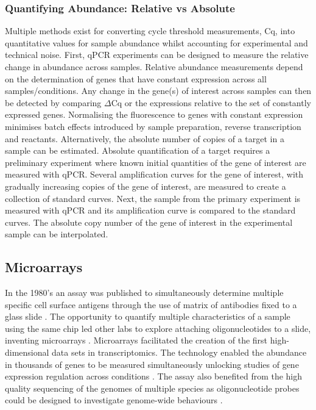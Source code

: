 \documentclass[../main.tex]{subfiles}
\begin{document}
\subsubsection{Quantifying Abundance: Relative vs Absolute}

Multiple methods exist for converting cycle threshold measurements, Cq, into quantitative values for sample abundance whilst accounting for experimental and technical noise.
First, qPCR experiments can be designed to measure the relative change in abundance across samples.
Relative abundance measurements depend on the determination of genes that have constant expression across all samples/conditions.
Any change in the gene(s) of interest across samples can then be detected by comparing $\Delta$Cq or the expressions relative to the set of constantly expressed genes.
Normalising the fluorescence to genes with constant expression minimises batch effects introduced by sample preparation, reverse transcription and reactants.
Alternatively, the absolute number of copies of a target in a sample can be estimated.
Absolute quantification of a target requires a preliminary experiment where known initial quantities of the gene of interest are measured with qPCR.
Several amplification curves for the gene of interest, with gradually increasing copies of the gene of interest, are measured to create a collection of standard curves.
Next, the sample from the primary experiment is measured with qPCR and its amplification curve is compared to the standard curves.
The absolute copy number of the gene of interest in the experimental sample can be interpolated.

\subsection{Microarrays}

In the 1980's an assay was published to simultaneously determine multiple specific cell surface antigens through the use of matrix of antibodies fixed to a glass slide \cite{TseWen1983}.
The opportunity to quantify multiple characteristics of a sample using the same chip led other labs to explore attaching oligonucleotides to a slide, inventing microarrays \parencite{Schena1995}.
Microarrays facilitated the creation of the first high-dimensional data sets in transcriptomics. 
The technology enabled the abundance in thousands of genes to be measured simultaneously unlocking studies of gene expression regulation across conditions \parencite{Gasch2000}. 
The assay also benefited from the high quality sequencing of the genomes of multiple species as oligonucleotide probes could be designed to investigate genome-wide behaviours \cite{Lander2001}.
\end{document}
